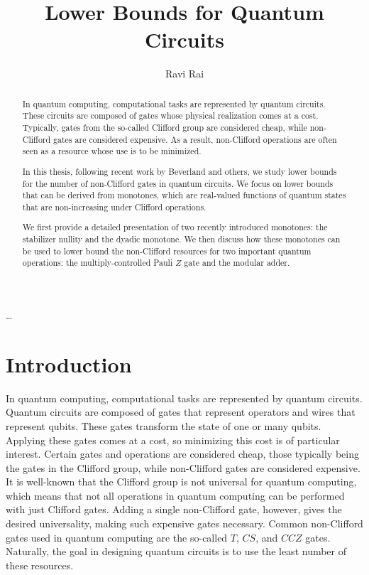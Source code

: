 \documentclass[12pt]{dalthesis}
\begin{document}
\title{Lower Bounds for Quantum Circuits}
\author{Ravi Rai}
\mcs
{}

\nolistoftables
\nolistoffigures

\frontmatter

\begin{abstract}
In quantum computing, computational tasks are represented by quantum circuits. These circuits are composed of gates whose physical realization comes at a cost. Typically, gates from the so-called Clifford group are considered cheap, while non-Clifford gates are considered expensive. As a result, non-Clifford operations are often seen as a resource whose use is to be minimized.

In this thesis, following recent work by Beverland and others, we study lower bounds for the number of non-Clifford gates in quantum circuits. We focus on lower bounds that can be derived from monotones, which are real-valued functions of quantum states that are non-increasing under Clifford operations.

We first provide a detailed presentation of two recently introduced monotones: the stabilizer nullity and the dyadic monotone. We then discuss how these monotones can be used to lower bound the non-Clifford resources for two important quantum operations: the multiply-controlled Pauli $Z$ gate and the modular adder.
\end{abstract}

\begin{acknowledgements}
\ldots
\end{acknowledgements}

\mainmatter

\chapter{Introduction}

In quantum computing, computational tasks are represented by quantum circuits. Quantum circuits are composed of gates that represent operators and wires that represent qubits. These gates transform the state of one or many qubits. Applying these gates comes at a cost, so minimizing this cost is of particular interest. Certain gates and operations are considered cheap, those typically being the gates in the Clifford group, while non-Clifford gates are considered expensive. It is well-known that the Clifford group is not universal for quantum computing, which means that not all operations in quantum computing can be performed with just Clifford gates. Adding a single non-Clifford gate, however, gives the desired universality, making such expensive gates necessary. Common non-Clifford gates used in quantum computing are the so-called $T$, $CS$, and $CCZ$ gates. Naturally, the goal in designing quantum circuits is to use the least number of these resources.
\end{document}
